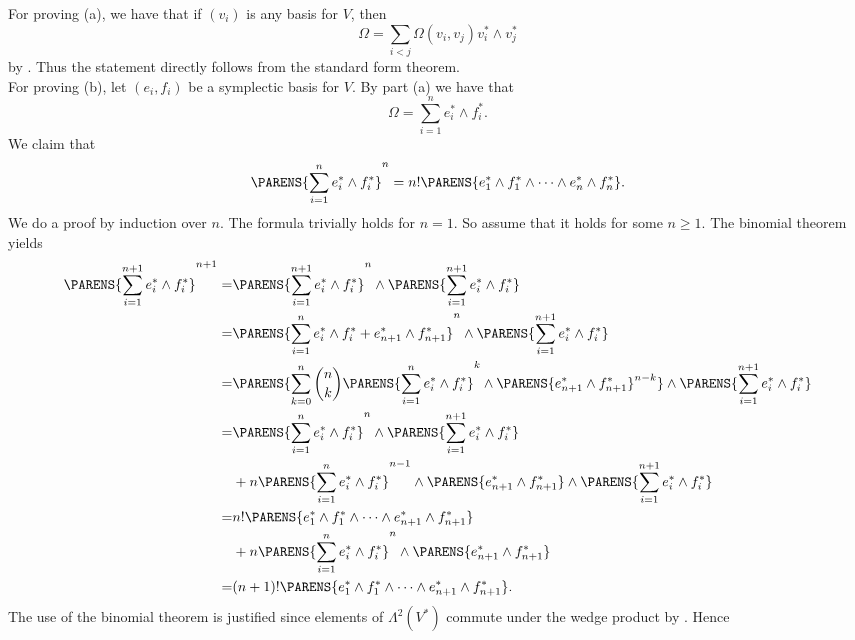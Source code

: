 \begin{solution}
	For proving (a), we have that if $(v_i)$ is any basis for $V$, then
	\begin{equation*}
		\Omega = \sum_{i < j} \Omega(v_i,v_j) v_i^* \wedge v_j^*
	\end{equation*}
	\noindent by \cite[353]{lee:smooth_manifolds:2013}. Thus the statement directly follows from the standard form theorem.\\
	For proving (b), let $(e_i,f_i)$ be a symplectic basis for $V$. By part (a) we have that 
	\begin{equation*}
		\Omega = \sum_{i = 1}^n e_i^* \wedge f_i^*.
	\end{equation*}
	We claim that
	\begin{equation}
		\PARENS{\sum_{i = 1}^n e_i^* \wedge f_i^*}^n = n! \PARENS{e_1^* \wedge f_1^* \wedge \dots \wedge e_n^* \wedge f_n^*}.
		\label{eq:power}
	\end{equation}
	We do a proof by induction over $n$. The formula trivially holds for $n = 1$. So assume that it holds for some $n \geq 1$. The binomial theorem yields
	\begin{align*}
		\PARENS{\sum_{i = 1}^{n + 1} e_i^* \wedge f_i^*}^{n + 1} =& \PARENS{\sum_{i = 1}^{n + 1} e_i^* \wedge f_i^*}^n \wedge \PARENS{\sum_{i = 1}^{n + 1} e_i^* \wedge f_i^*}\\
		=& \PARENS{\sum_{i = 1}^n e_i^* \wedge f_i^* + e_{n + 1}^* \wedge f_{n + 1}^*}^n \wedge \PARENS{\sum_{i = 1}^{n + 1} e_i^* \wedge f_i^*}\\
		=& \PARENS{\sum_{k = 0}^n {n \choose k}  \PARENS{\sum_{i = 1}^n e_i^* \wedge f_i^*}^k \wedge \PARENS{ e_{n + 1}^* \wedge f_{n + 1}^*}^{n - k}} \wedge \PARENS{\sum_{i = 1}^{n + 1} e_i^* \wedge f_i^*}\\
		=& \PARENS{\sum_{i = 1}^n e_i^* \wedge f_i^*}^n \wedge \PARENS{\sum_{i = 1}^{n + 1} e_i^* \wedge f_i^*}\\
		& + n\PARENS{\sum_{i = 1}^n e_i^* \wedge f_i^*}^{n - 1} \wedge \PARENS{ e_{n + 1}^* \wedge f_{n + 1}^*} \wedge \PARENS{\sum_{i = 1}^{n + 1} e_i^* \wedge f_i^*}\\
		=& n! \PARENS{e_1^* \wedge f_1^* \wedge \dots \wedge e_{n + 1}^* \wedge f_{n + 1}^*}\\
		&+ n\PARENS{\sum_{i = 1}^n e_i^* \wedge f_i^*}^n \wedge \PARENS{ e_{n + 1}^* \wedge f_{n + 1}^*}\\
		=&  (n + 1)! \PARENS{e_1^* \wedge f_1^* \wedge \dots \wedge e_{n + 1}^* \wedge f_{n + 1}^*}.
	\end{align*}
	The use of the binomial theorem is justified since elements of $\Lambda^2(V^*)$ commute under the wedge product by \cite[356]{lee:smooth_manifolds:2013}. Hence

\end{solution}
